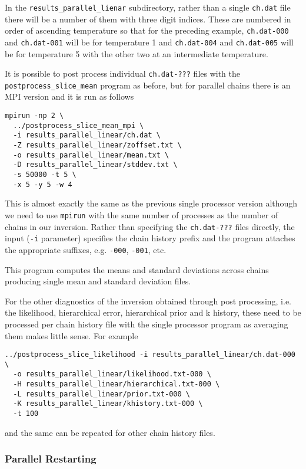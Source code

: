 \documentclass[a4paper,12pt]{article}
\begin{document}
In the {\tt results\_parallel\_lienar} subdirectory, rather than
a single {\tt ch.dat} file there will be a number of them with
three digit indices. These are numbered in order of ascending
temperature so that for the preceding example, {\tt ch.dat-000}
and {\tt ch.dat-001} will be for temperature 1 and
{\tt ch.dat-004} and {\tt ch.dat-005} will be for temperature
5 with the other two at an intermediate temperature.

It is possible to post process individual {\tt ch.dat-???} files
with the {\tt postprocess\_slice\_mean} program as before, but
for parallel chains there is an MPI version and it is run as
follows

\begin{verbatim}
mpirun -np 2 \
  ../postprocess_slice_mean_mpi \
  -i results_parallel_linear/ch.dat \
  -Z results_parallel_linear/zoffset.txt \
  -o results_parallel_linear/mean.txt \
  -D results_parallel_linear/stddev.txt \
  -s 50000 -t 5 \
  -x 5 -y 5 -w 4
\end{verbatim}

This is almost exactly the same as the previous single processor version
although we need to use {\tt mpirun} with the same number of processes
as the number of chains in our inversion. Rather than specifying the
{\tt ch.dat-???} files directly, the input ({\tt -i} parameter)
specifies the chain history prefix and the program attaches the
appropriate suffixes, e.g.  {\tt -000}, {\tt -001}, etc.

This program computes the means and standard deviations across chains
producing single mean and standard deviation files.

For the other diagnostics of the inversion obtained through post
processing, i.e.  the likelihood, hierarchical error, hierarchical
prior and k history, these need to be processed per chain history file
with the single processor program as averaging them makes little sense. For
example

\begin{verbatim}
../postprocess_slice_likelihood -i results_parallel_linear/ch.dat-000 \
  -o results_parallel_linear/likelihood.txt-000 \
  -H results_parallel_linear/hierarchical.txt-000 \
  -L results_parallel_linear/prior.txt-000 \
  -K results_parallel_linear/khistory.txt-000 \
  -t 100
\end{verbatim}

and the same can be repeated for other chain history files.

\subsubsection{Parallel Restarting}
\end{document}
